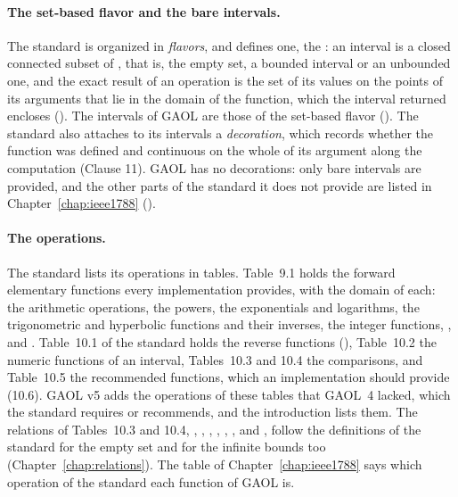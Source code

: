 \paragraph{The set-based flavor and the bare intervals.} The standard is
organized in \emph{flavors}, and defines one, the :
an interval is a closed connected subset of \RSet, that is, the empty set,
a bounded interval  or an unbounded one, and the exact result of
an operation is the set of its values on the points of its arguments that
lie in the domain of the function, which the interval returned encloses
(). The intervals of GAOL are those of the
set-based flavor (). The standard also attaches to
its intervals a \emph{decoration}, which records whether the function was
defined and continuous on the whole of its argument along the computation
(Clause 11). GAOL has no decorations: only bare intervals are provided, and
the other parts of the standard it does not provide are listed in
Chapter~\ref{chap:ieee1788} ().
%

\paragraph{The operations.} The standard lists its operations in tables.
Table~9.1 holds the forward elementary functions every implementation
provides, with the domain of each: the arithmetic operations, the powers,
the exponentials and logarithms, the trigonometric and hyperbolic functions
and their inverses, the integer functions, ,  and
. Table~10.1 of the standard holds the reverse functions
(), Table~10.2 the numeric functions of an
interval, Tables~10.3 and 10.4 the comparisons, and Table~10.5 the
recommended functions, which an implementation should provide (10.6). GAOL v5
adds the operations of these tables that GAOL~4 lacked, which the standard
requires or recommends, and the introduction lists them.\newinvfive{} The
relations of Tables~10.3 and 10.4, , ,
, , , ,
 and , follow the definitions of the standard
for the empty set and for the infinite bounds too
(Chapter~\ref{chap:relations}).\newinvfive{} The table of
Chapter~\ref{chap:ieee1788} says which operation of the standard each
function of GAOL is.
%

